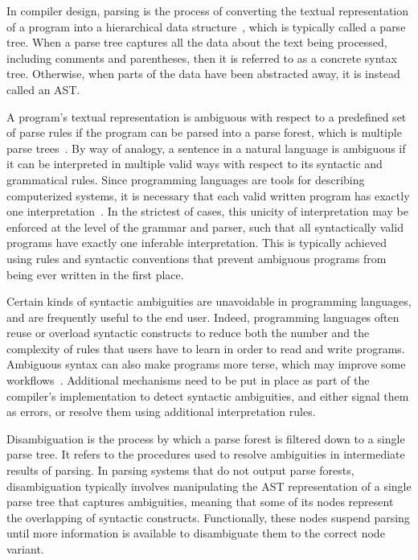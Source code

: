 
In compiler design, parsing is the process of converting the textual representation of a program into a hierarchical data structure~\cite{aho2007compilers, afroozeh2019practical}, which is typically called a parse tree.
When a parse tree captures all the data about the text being processed, including comments and parentheses, then it is referred to as a concrete syntax tree.
Otherwise, when parts of the data have been abstracted away, it is instead called an \ac{AST}.


A program's textual representation is ambiguous with respect to a predefined set of parse rules if the program can be parsed into a parse forest, which is multiple parse trees~\cite{aho2007compilers}.
By way of analogy, a sentence in a natural language is ambiguous if it can be interpreted in multiple valid ways with respect to its syntactic and grammatical rules.
Since programming languages are tools for describing computerized systems, it is necessary that each valid written program has exactly one interpretation~\cite{aho2007compilers}.
In the strictest of cases, this unicity of interpretation may be enforced at the level of the grammar and parser, such that all syntactically valid programs have exactly one inferable interpretation.
This is typically achieved using rules and syntactic conventions that prevent ambiguous programs from being ever written in the first place.

Certain kinds of syntactic ambiguities are unavoidable in programming languages, and are frequently useful to the end user.
Indeed, programming languages often reuse or overload syntactic constructs to reduce both the number and the complexity of rules that users have to learn in order to read and write programs.
Ambiguous syntax can also make programs more terse, which may improve some workflows~\cite{resolveAmbiguity}.
Additional mechanisms need to be put in place as part of the compiler's implementation to detect syntactic ambiguities, and either signal them as errors, or resolve them using additional interpretation rules.


Disambiguation is the process by which a parse forest is filtered down to a single parse tree.
It refers to the procedures used to resolve ambiguities in intermediate results of parsing.
In parsing systems that do not output parse forests, disambiguation typically involves manipulating the \ac{AST} representation of a single parse tree that captures ambiguities, meaning that some of its nodes represent the overlapping of syntactic constructs.
Functionally, these nodes suspend parsing until more information is available to disambiguate them to the correct node variant.

